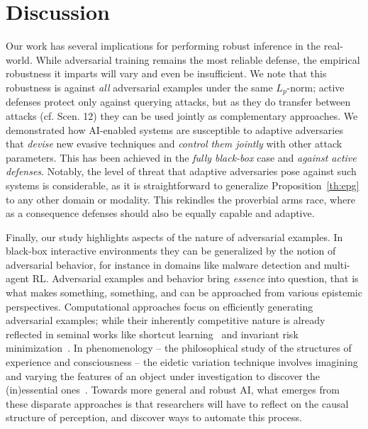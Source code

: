 \section{Discussion}
\label{sec:discussion}

Our work has several implications for performing robust inference in the real-world.
While adversarial training remains the most reliable defense, the empirical robustness it imparts will vary and even be insufficient.
We note that this robustness is against \emph{all} adversarial examples under the same $L_p$-norm; active defenses protect only against querying attacks, but as they do transfer between attacks (cf. Scen. 12) they can be used jointly as complementary approaches.
We demonstrated how AI-enabled systems are susceptible to adaptive adversaries that \emph{devise} new evasive techniques and \emph{control them jointly} with other attack parameters.
This has been achieved in the \emph{fully black-box} case and \emph{against active defenses}.
Notably, the level of threat that adaptive adversaries pose against such systems is considerable, as it is straightforward to generalize Proposition~\ref{th:epg} to any other domain or modality.
This rekindles the proverbial arms race, where as a consequence defenses should also be equally capable and adaptive.

Finally, our study highlights aspects of the nature of adversarial examples.
In black-box interactive environments they can be generalized by the notion of adversarial behavior, for instance in domains like malware detection and multi-agent \gls{RL}.
Adversarial examples and behavior bring \textit{essence} into question, that is what makes something, something, and can be approached from various epistemic perspectives. Computational approaches focus on efficiently generating adversarial examples; while their inherently competitive nature is already reflected in seminal works like shortcut learning~\cite{geirhos2020shortcut} and invariant risk minimization~\cite{ahuja2020invariant}.
In phenomenology -- the philosophical study of the structures of experience and consciousness -- the eidetic variation technique involves imagining and varying the features of an object under investigation to discover the (in)essential ones~\cite{levin1968induction}.
Towards more general and robust AI, what emerges from these disparate approaches is that researchers will have to reflect on the causal structure of perception, and discover ways to automate this process.

